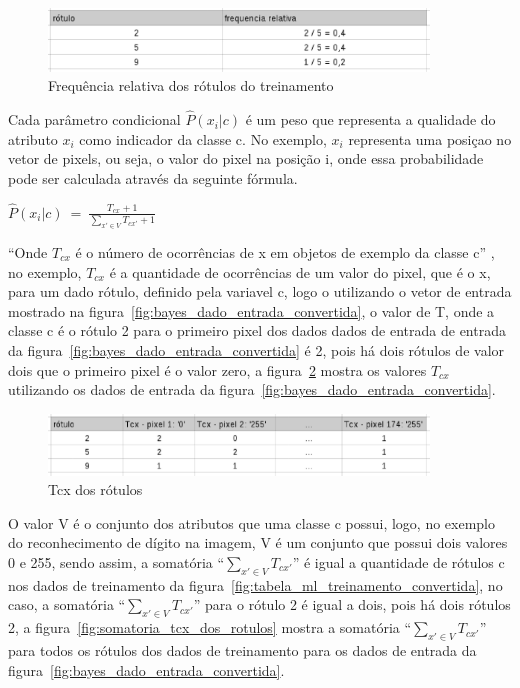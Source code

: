 \begin{figure}[h]
  \centering
  \includegraphics[width=0.9\textwidth]{figuras/frequencia_relativa.eps}
  \caption{Frequência relativa dos rótulos do treinamento}
  \label{fig:frequencia_relativa}
\end{figure}

Cada parâmetro condicional $\hat{P}(x_i | c)$ é um peso que representa a qualidade
do atributo $x_i$ como indicador da classe c. No exemplo, $x_i$ representa uma
posiçao no vetor de pixels, ou seja, o valor do pixel na posição i, onde essa
probabilidade pode ser calculada através da seguinte fórmula.

\begin{center}

$ \hat{P}(x_i | c) \ = \ \frac{T_{cx} + 1}{\sum\limits_{x' \in V}T_{cx'} + 1} $
\\
\end{center}

``Onde $T_{cx}$ é o número de ocorrências de x em objetos de exemplo da classe c''
, no exemplo, $T_{cx}$ é a quantidade de
ocorrências de um valor do pixel, que é o x, para um dado rótulo, definido pela
variavel c, logo o utilizando o vetor de entrada mostrado na figura~\ref{fig:bayes_dado_entrada_convertida},
o valor de T, onde a classe c é o rótulo 2 para o primeiro pixel dos dados dados
de entrada de entrada da figura~\ref{fig:bayes_dado_entrada_convertida} é 2, pois
há dois rótulos de valor dois que o primeiro pixel é o valor zero, a figura~\ref{fig:tcx_dos_rotulos}
mostra os valores $T_{cx}$ utilizando os dados de entrada da figura~\ref{fig:bayes_dado_entrada_convertida}.

\begin{figure}[h]
  \centering
  \includegraphics[width=0.9\textwidth]{figuras/tcx_dos_rotulos.eps}
  \caption{Tcx dos rótulos}
  \label{fig:tcx_dos_rotulos}
\end{figure}

O valor V é o conjunto dos atributos que uma classe c possui, logo, no exemplo
do reconhecimento de dígito na imagem, V é um conjunto que possui dois valores
0 e 255, sendo assim, a somatória ``$\sum\limits_{x' \in V}T_{cx'}$'' é igual a
quantidade de rótulos c nos dados de treinamento da figura~\ref{fig:tabela_ml_treinamento_convertida},
no caso, a somatória ``$\sum\limits_{x' \in V}T_{cx'}$'' para o rótulo 2 é igual
a dois, pois há dois rótulos 2, a figura~\ref{fig:somatoria_tcx_dos_rotulos}
mostra a somatória ``$\sum\limits_{x' \in V}T_{cx'}$'' para todos os rótulos dos
dados de treinamento para os dados de entrada da figura~\ref{fig:bayes_dado_entrada_convertida}.

